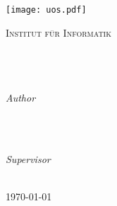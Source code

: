 %
%
%
%
%
%

\begin{titlepage}
	\centering
	\thispagestyle{empty}
	\begin{center}
	\texttt{[image: uos.pdf]}
	\end{center}
	\LARGE{\textsc{Institut für Informatik}}
	\vfill
	\textsc{\Large{\emph{\mycourse}}}\\[0.5cm]
	\HRule\\[0.4cm]
	\vspace{8mm}
	\Large{\textbf{{\selectfont\myMaintitle}}}\\
	\vspace{8mm}
	\HRule\\[0.4cm]
	\vspace{9mm}

	\begin{minipage}{0.4\textwidth}
		\begin{flushleft}
			\large
			\textit{Author}\\
			\textsc{\myName}\\ %
			\textsc{\myMatrikel} %
		\end{flushleft}
	\end{minipage}
	~
	\begin{minipage}{0.4\textwidth}
		\begin{flushright}
			\large
			\textit{Supervisor}\\
			\textsc{\fistSupervisor}\\ %
			\textsc{\secSupervisor} %
		\end{flushright}
	\end{minipage}

	\vspace{5cm}
	\large{\today}
	\vfill
	\end{titlepage}
	\newpage
